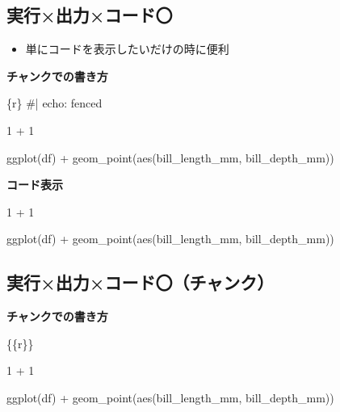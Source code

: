 \documentclass[
  b5paper,
  xelatex, ja=standard]{bxjsbook}
\newenvironment{Shaded}{\begin{snugshade}}{\end{snugshade}}
\newcommand{\DecValTok}[1]{\textcolor[rgb]{0.68,0.00,0.00}{#1}}
\newcommand{\FunctionTok}[1]{\textcolor[rgb]{0.28,0.35,0.67}{#1}}
\newcommand{\InformationTok}[1]{\textcolor[rgb]{0.37,0.37,0.37}{#1}}
\newcommand{\NormalTok}[1]{\textcolor[rgb]{0.00,0.23,0.31}{#1}}
\newcommand{\SpecialCharTok}[1]{\textcolor[rgb]{0.37,0.37,0.37}{#1}}
\providecommand{\tightlist}{%
  \setlength{\itemsep}{0pt}\setlength{\parskip}{0pt}}\usepackage{longtable,booktabs,array}
\begin{document}
\subsection{実行×\textbar 出力×\textbar コード〇}

\begin{itemize}
\tightlist
\item
  単にコードを表示したいだけの時に便利
\end{itemize}

\textbf{チャンクでの書き方}

\begin{Shaded}
\begin{Highlighting}[]
\InformationTok{\textasciigrave{}\textasciigrave{}\textasciigrave{}\{r\}}
\InformationTok{\#| echo: fenced}

\InformationTok{1 + 1}


\InformationTok{ggplot(df) +}
\InformationTok{  geom\_point(aes(bill\_length\_mm, bill\_depth\_mm))}
\InformationTok{\textasciigrave{}\textasciigrave{}\textasciigrave{}}
\end{Highlighting}
\end{Shaded}

\textbf{コード表示}

\begin{Shaded}
\begin{Highlighting}[]
\DecValTok{1} \SpecialCharTok{+} \DecValTok{1}


\FunctionTok{ggplot}\NormalTok{(df) }\SpecialCharTok{+}
  \FunctionTok{geom\_point}\NormalTok{(}\FunctionTok{aes}\NormalTok{(bill\_length\_mm, bill\_depth\_mm))}
\end{Highlighting}
\end{Shaded}

\subsection{実行×\textbar 出力×\textbar コード〇（チャンク）}

\textbf{チャンクでの書き方}

\begin{Shaded}
\begin{Highlighting}[]
\InformationTok{\textasciigrave{}\textasciigrave{}\textasciigrave{}\{\{r\}\}}


\InformationTok{1 + 1}


\InformationTok{ggplot(df) +}
\InformationTok{  geom\_point(aes(bill\_length\_mm, bill\_depth\_mm))}
\InformationTok{\textasciigrave{}\textasciigrave{}\textasciigrave{}}
\end{Highlighting}
\end{Shaded}
\end{document}
